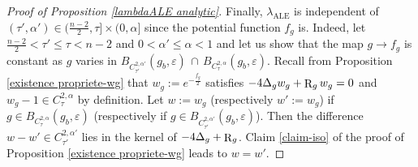\documentclass[a4paper,11pt,reqno]{amsart}
\def\R{\mathop{\rm R}\nolimits}
\numberwithin{equation}{section}
\begin{document}
\begin{proof}[Proof of Proposition \ref{lambdaALE analytic}]
		 Finally, $\lambda_{\operatorname{ALE}}$ is independent of $(\tau',\alpha')\in(\frac{n-2}{2},\tau]\times(0,\alpha]$ since the potential function $f_g$ is. Indeed, let $\frac{n-2}{2}<\tau'\leq \tau<n-2$ and $0<\alpha'\leq \alpha<1$ and let us show that the map $g\rightarrow f_g$ is constant as $g$ varies in $B_{C^{2,\alpha'}_{\tau'}}(g_b,\varepsilon)\,\cap\,B_{C^{2,\alpha}_{\tau}}(g_b,\varepsilon)$. Recall from Proposition \ref{existence propriete-wg} that $w_g:=e^{-\frac{f_g}{2}}$ satisfies $-4\Delta_gw_g+\R_gw_g=0$ and $w_g-1\in C^{2,\alpha}_{\tau}$ by definition. Let $w:=w_g$ (respectively $w':=w_g$) if $g\in B_{C^{2,\alpha}_{\tau}}(g_b,\varepsilon)$ (respectively if $g\in B_{C^{2,\alpha'}_{\tau'}}(g_b,\varepsilon)$). Then the difference $w-w'\in C^{2,\alpha'}_{\tau'}$ lies in the kernel of $-4\Delta_g+\R_g$. Claim \ref{claim-iso} of the proof of Proposition \ref{existence propriete-wg}  leads to $w=w'$.

	\end{proof}
	
\end{document}
